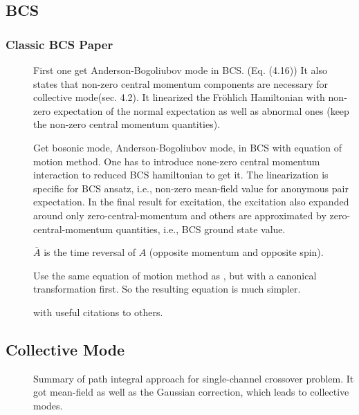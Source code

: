 \subsection{BCS}
\subsubsection{Classic BCS Paper}

\begin{description}
 \item [\cite{BogoliubovColl}] First one get Anderson-Bogoliubov mode in BCS.  (Eq. (4.16))  It also states that non-zero central momentum components are necessary for collective mode(sec. 4.2).  It linearized the Fr\"{o}hlich Hamiltonian with non-zero expectation of the normal expectation as well as abnormal ones (keep the non-zero central momentum quantities). 
  \item [\cite{AndersonBCS}]Get bosonic mode, Anderson-Bogoliubov mode, in BCS with  equation of motion method.  One has to introduce none-zero central momentum interaction to reduced BCS hamiltonian to get it.  The linearization is specific for BCS ansatz, i.e., non-zero mean-field value for anonymous pair expectation. In the final result for excitation, the excitation also expanded around only zero-central-momentum and others are approximated by zero-central-momentum quantities, i.e., BCS ground state value. 
   
   $\bar{A}$ is the time reversal of $A$ (opposite momentum and opposite spin).
	 
\item[\cite{Rickayzen}] Use the same equation of motion method as \cite{AndersonBCS}, but with a canonical transformation first.  So the resulting equation is much simpler. 
\item[\cite{BcsExact}] with useful citations to others.        
 \end{description}

\subsection{Collective Mode}
\begin{description}
\item[\cite{RanderiaBEC, Randeria1997,Randeria2008}]Summary of path integral approach for single-channel crossover problem.  It got mean-field as well as the Gaussian correction, which leads to collective modes.   
\end{description}

